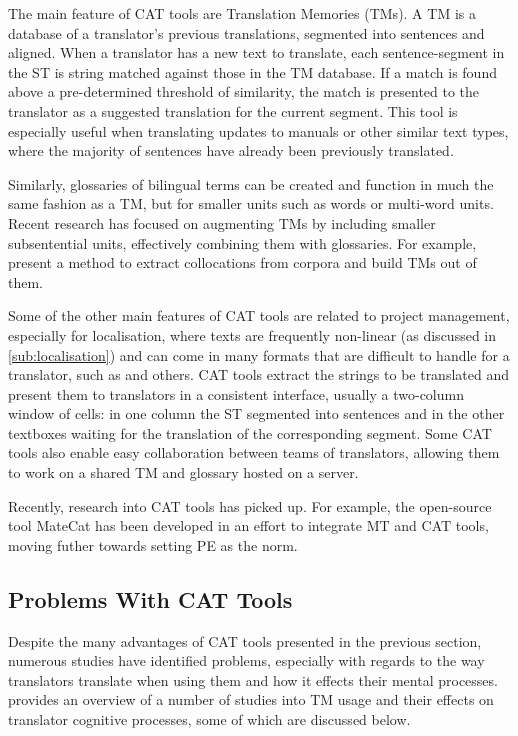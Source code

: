 The main feature of \ac{CAT} tools are Translation Memories (\acsp{TM}). A \ac{TM} is a database of a translator's previous translations, segmented into sentences and aligned. When a translator has a new text to translate, each sentence-segment in the \ac{ST} is string matched against those in the \ac{TM} database. If a match is found above a pre-determined threshold of similarity, the match is presented to the translator as a suggested translation for the current segment. This tool is especially useful when translating updates to manuals or other similar text types, where the majority of sentences have already been previously translated.

Similarly, glossaries of bilingual terms can be created and function in much the same fashion as a \ac{TM}, but for smaller units such as words or multi-word units. Recent research has focused on augmenting \ac{TM}s by including smaller subsentential units, effectively combining them with glossaries. For example, \textcite{chuang2005collocational} present a method to extract collocations from corpora and build \ac{TM}s out of them.

Some of the other main features of \ac{CAT} tools are related to project management, especially for localisation, where texts are frequently non-linear (as discussed in \autoref{sub:localisation}) and can come in many formats that are difficult to handle for a translator, such as  and others. \ac{CAT} tools extract the strings to be translated and present them to translators in a consistent interface, usually a two-column window of cells: in one column the \ac{ST} segmented into sentences and in the other textboxes waiting for the translation of the corresponding segment. Some \ac{CAT} tools also enable easy collaboration between teams of translators, allowing them to work on a shared \ac{TM} and glossary hosted on a server.

Recently, research into \ac{CAT} tools has picked up. For example, the open-source tool MateCat \parencite{federico2014matecat} has been developed in an effort to integrate \ac{MT} and \ac{CAT} tools, moving futher towards setting \ac{PE} as the norm. 


\subsection{Problems With CAT Tools}

\noindent Despite the many advantages of \ac{CAT} tools presented in the previous section, numerous studies have identified problems, especially with regards to the way translators translate when using them and how it effects their mental processes. \textcite{christensen2011studies} provides an overview of a number of studies into \ac{TM} usage and their effects on translator cognitive processes, some of which are discussed below.


